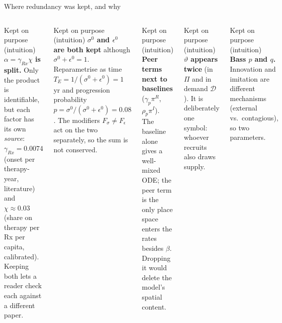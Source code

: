﻿\documentclass[9pt,aspectratio=169]{beamer}
\newenvironment{kept}{\begin{exampleblock}{Kept on purpose (intuition)}\small}{\end{exampleblock}}
\begin{document}
\begin{frame}{Where redundancy was kept, and why}
 \small
 \begin{columns}[T]
 \begin{kept}
  \textbf{$\alpha=\gamma_{Rx}\chi$ is split.} Only the product is identifiable, but each factor has its own \emph{source}: $\gamma_{Rx}=0.0074$ (onset per therapy-year, literature) and $\chi\approx0.03$ (share on therapy per Rx per capita, calibrated). Keeping both lets a reader check each against a different paper.
 \end{kept}
 \begin{kept}
  \textbf{$\sigma^0$ and $\epsilon^0$ are both kept} although $\sigma^0+\epsilon^0=1$. Reparametrise as time $T_E=1/(\sigma^0+\epsilon^0)=1$ yr and progression probability $p=\sigma^0/(\sigma^0+\epsilon^0)=0.08$. The modifiers $F_\sigma\neq F_\epsilon$ act on the two separately, so the sum is not conserved.
 \end{kept}
 \begin{kept}
  \textbf{Peer terms next to baselines} ($\gamma_p\pi^R$, $\rho_p\pi^I$). The baseline alone gives a well-mixed ODE; the peer term is the only place space enters the rates besides $\beta$. Dropping it would delete the model's spatial content.
 \end{kept}
 \begin{kept}
  \textbf{$\vartheta$ appears twice} (in $\Pi$ and in demand $\mathcal D$). It is deliberately one symbol: whoever recruits also draws supply.
 \end{kept}
 \begin{kept}
  \textbf{Bass $p$ and $q$.} Innovation and imitation are different mechanisms (external vs.\ contagious), so two parameters.
 \end{kept}
 \end{columns}
\end{frame}
\end{document}
